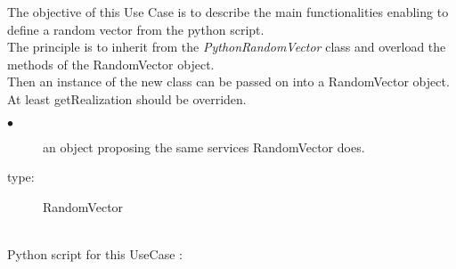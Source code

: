 \renewcommand{\filename}{docUC_InputNoData_CustomRandVectFromPython.tex}
\renewcommand{\filetitle}{UC : Creation of a custom random vector from the python script}

\HeaderIIILevel


\label{manipulation_random vector}

The objective of this Use Case is to describe the main functionalities enabling to define a random vector from the python script.\\

The principle is to inherit from the \textit{PythonRandomVector} class and overload the methods of the RandomVector object.\\
Then an instance of the new class can be passed on into a RandomVector object.\\
At least getRealization should be overriden.

             {
               \begin{description}
               \item[$\bullet$] an object proposing the same services RandomVector does.
               \item[type:] RandomVector
               \end{description}
             }

             \textspace\\
             Python script for this UseCase :

